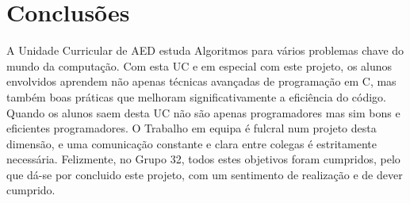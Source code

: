 \documentclass[14pt]{article}
\begin{document}
    \section[Conclusões]{Conclusões}
    A Unidade Curricular de AED estuda Algoritmos para vários problemas chave do mundo da computação. Com esta UC e em especial
    com este projeto, os alunos envolvidos aprendem não apenas técnicas avançadas de programação em C, mas também boas práticas
    que melhoram significativamente a eficiência do código. Quando os alunos saem desta UC não são apenas programadores mas sim
    bons e eficientes programadores. O Trabalho em equipa é fulcral num projeto desta dimensão, e uma comunicação constante e clara
    entre colegas é estritamente necessária. Felizmente, no Grupo 32, todos estes objetivos foram cumpridos, pelo que dá-se por concluido
    este projeto, com um sentimento de realização e de dever cumprido.
\end{document}
